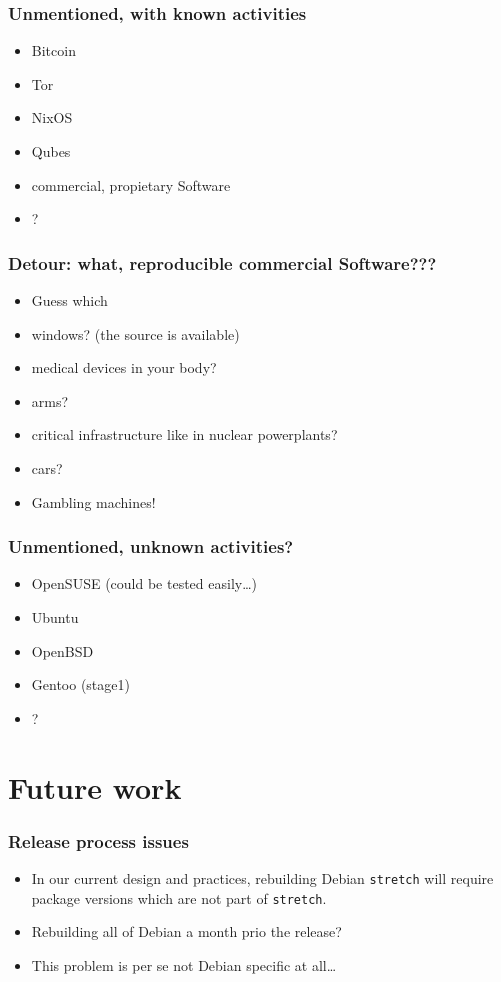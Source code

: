 \documentclass[14pt,aspectratio=169]{beamer}
\newif\ifplacelogo
\begin{document}
\begin{frame}
 \frametitle{Unmentioned, with known activities}
 \begin{itemize}
\item Bitcoin
\item Tor
    \item NixOS
    \item Qubes
\item    commercial, propietary Software
\item ?
 \end{itemize}
\end{frame}

\begin{frame}
 \frametitle{Detour: what, reproducible commercial Software???}
 \begin{itemize}
\item Guess which
\item <2-3>   windows? (the source is available)
\item <2-3>   medical devices in your body?
\item <2-3>   arms?
\item <2-3>   critical infrastructure like in nuclear powerplants?
\item <2-3>   cars?
\item <3> Gambling machines!
 \end{itemize}
\end{frame}

\begin{frame}
 \frametitle{Unmentioned, unknown activities?}
 \begin{itemize}
\item  OpenSUSE (could be tested easily…)
\item  Ubuntu
\item  OpenBSD
\item  Gentoo (stage1)
 \item ?
\end{itemize}
\end{frame}


\placelogotrue

\section{Future work}



\begin{frame}
 \frametitle{Release process issues}
 \begin{itemize}
  \item In our current design and practices, rebuilding Debian
  \texttt{stretch} will require
  package versions which are not part of \texttt{stretch}.
  \item {Rebuilding all of Debian a month prio the release? }
  \item<2> This problem is per se not Debian specific at all…
 \end{itemize}
\end{frame}
\end{document}
